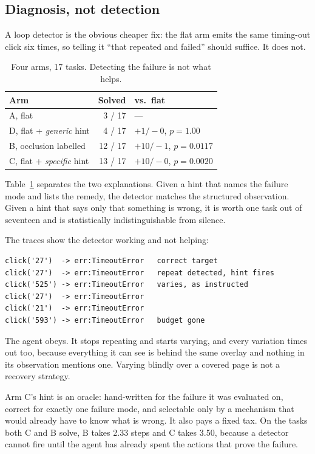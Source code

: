 \documentclass[conference]{IEEEtran}
\begin{document}
\subsection{Diagnosis, not detection}
\label{sec:diagnosis}

A loop detector is the obvious cheaper fix: the flat arm emits the same
timing-out click six times, so telling it ``that repeated and failed'' should
suffice. It does not.

\begin{table}[t]
\caption{Four arms, 17 tasks. Detecting the failure is not what helps.}
\label{tab:arms}
\centering
\begin{tabular}{@{}lrl@{}}
\toprule
Arm & Solved & vs.\ flat \\
\midrule
A, flat                        & 3 / 17  & --- \\
D, flat + \emph{generic} hint  & 4 / 17  & $+1/-0$, $p = 1.00$ \\
B, occlusion labelled          & 12 / 17 & $+10/-1$, $p = 0.0117$ \\
C, flat + \emph{specific} hint & 13 / 17 & $+10/-0$, $p = 0.0020$ \\
\bottomrule
\end{tabular}
\end{table}

Table~\ref{tab:arms} separates the two explanations. Given a hint that names
the failure mode and lists the remedy, the detector matches the structured
observation. Given a hint that says only that something is wrong, it is worth
one task out of seventeen and is statistically indistinguishable from silence.

The traces show the detector working and not helping:

\begin{verbatim}
click('27')  -> err:TimeoutError   correct target
click('27')  -> err:TimeoutError   repeat detected, hint fires
click('525') -> err:TimeoutError   varies, as instructed
click('27')  -> err:TimeoutError
click('21')  -> err:TimeoutError
click('593') -> err:TimeoutError   budget gone
\end{verbatim}

The agent obeys. It stops repeating and starts varying, and every variation
times out too, because everything it can see is behind the same overlay and
nothing in its observation mentions one. Varying blindly over a covered page is
not a recovery strategy.

Arm C's hint is an oracle: hand-written for the failure it was evaluated on,
correct for exactly one failure mode, and selectable only by a mechanism that
would already have to know what is wrong. It also pays a fixed tax. On the
tasks both C and B solve, B takes 2.33 steps and C takes 3.50, because a
detector cannot fire until the agent has already spent the actions that prove
the failure.
\end{document}
